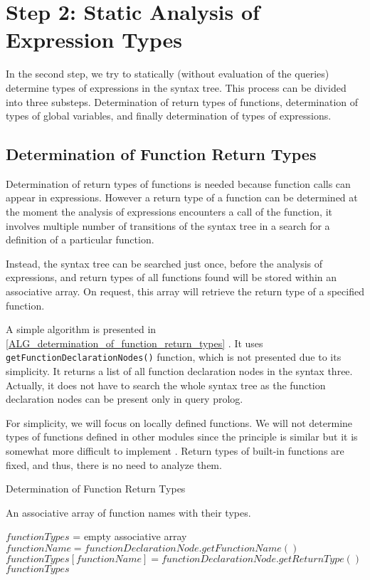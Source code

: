 \section{Step 2: Static Analysis of Expression Types}

In the second step, we try to statically (without evaluation of the queries) determine types of expressions in the syntax tree. This process can be divided into three substeps. Determination of return types of functions, determination of types of global variables, and finally determination of types of expressions.

\subsection{Determination of Function Return Types}
Determination of return types of functions is needed because function calls can appear in expressions. However a return type of a function can be determined at the moment the analysis of expressions encounters a call of the function, it involves multiple number of transitions of the syntax tree in a search for a definition of a particular function.

Instead, the syntax tree can be searched just once, before the analysis of expressions, and return types of all functions found will be stored within an associative array. On request, this array will retrieve the return type of a specified function.

A simple algorithm is presented in \ref{ALG_determination_of_function_return_types} . It uses \texttt{getFunctionDeclarationNodes()} function, which is not presented due to its simplicity. It returns a list of all function declaration nodes in the syntax three. Actually, it does not have to search the whole syntax tree as the function declaration nodes can be present only in query prolog. 

For simplicity, we will focus on locally defined functions. We will not determine types of functions defined in other modules since the principle is similar but it is somewhat more difficult to implement . Return types of built-in functions are fixed, and thus, there is no need to analyze them.

\begin{algorithm}
\caption{Determination of Function Return Types}
\label{ALG_determination_of_function_return_types}
\begin{algorithmic}[1]
\ENSURE An associative array of function names with their types.

\STATE $functionTypes$ = empty associative array
    \STATE $functionName = functionDeclarationNode.getFunctionName()$
    \STATE $functionTypes[functionName] = functionDeclarationNode.getReturnType()$
\ENDFOR
\RETURN $functionTypes$
\end{algorithmic}
\end{algorithm}

